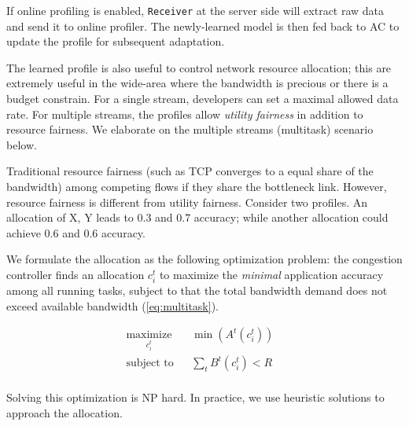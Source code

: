 If online profiling is enabled, \texttt{Receiver} at the server side will
extract raw data and send it to online profiler. The newly-learned model is then
fed back to AC to update the profile for subsequent adaptation.

%     

 The learned profile is also useful to control
network resource allocation; this are extremely useful in the wide-area where
the bandwidth is precious or there is a budget constrain. For a single stream,
developers can set a maximal allowed data rate. For multiple streams, the
profiles allow \textit{utility fairness} in addition to resource fairness. We
elaborate on the multiple streams (multitask) scenario below.

Traditional resource fairness (such as TCP converges to a equal share of the
bandwidth) among competing flows if they share the bottleneck link. However,
resource fairness is different from utility fairness. Consider two profiles.  An
allocation of X, Y leads to 0.3 and 0.7 accuracy; while another allocation could
achieve 0.6 and 0.6 accuracy.

We formulate the allocation as the following optimization problem: the
congestion controller finds an allocation $c_i^t$ to maximize the
\textit{minimal} application accuracy among all running tasks, subject to that
the total bandwidth demand does not exceed available bandwidth
(\autoref{eq:multitask}).

\begin{equation}
  \label{eq:multitask}
  \begin{aligned}
    & \underset{c_i^t}{\text{maximize}} & & \min({A^t(c_i^t)}) & & \\
    & \text{subject to} & & \sum_t{B^t(c_i^t)} < R & & \\
  \end{aligned}
\end{equation}

Solving this optimization is NP hard. In practice, we use heuristic solutions to
approach the allocation.

\newpage

